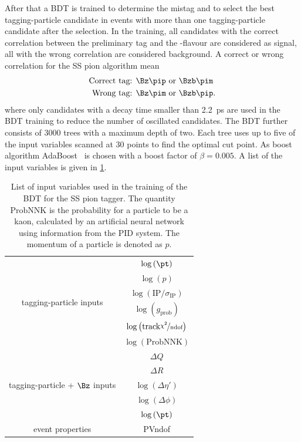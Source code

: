 After that a BDT is trained to determine the mistag and to select the best tagging-particle candidate in events with more than one tagging-particle candidate after the selection.
In the training, all candidates with the correct correlation between the preliminary tag and the \B-flavour are considered as signal, all with the wrong correlation are considered background.
A correct or wrong correlation for the SS pion algorithm mean
\begin{align*}
	\text{Correct tag: }& \Bz\pip \text{ or } \Bzb\pim\\
	\text{Wrong tag: }& \Bz\pim \text{ or } \Bzb\pip.
\end{align*}
where only \B candidates with a decay time smaller than \SI{2.2}{\pico\second} are used in the BDT training to reduce the number of oscillated \B candidates.
The BDT further consists of \num{3000} trees with a maximum depth of two.
Each tree uses up to five of the input variables scanned at 30 points to find the optimal cut point.
As boost algorithm AdaBoost~\cite{AdaBoost} is chosen with a boost factor of $\beta=0.005$.
A list of the input variables is given in \cref{tab:BDTInputSSPion}.
\begin{table}[tbp]
	\centering
	\caption{List of input variables used in the training of the BDT for the SS pion tagger.
	The quantity $\mathrm{ProbNNK}$ is the probability for a particle to be a kaon, calculated by an artificial neural network using information from the \lhcb PID system.
	The momentum of a particle is denoted as $p$.}
	\begin{tabular}{cc}
		\toprule
		\multirow{6}{*}{tagging-particle inputs} 	& $\log\left(\pt\right)$ \\
													& $\log\left(p\right)$ \\
													& $\log\left(\text{IP}/\sigma_\text{IP}\right)$\\
													& $\log\left(g_\text{prob}\right)$\\
													& $\log\left(\text{track} \nicefrac{\chi^2}{\text{ndof}}\right)$ \\
													& $\log\left(\text{ProbNNK}\right)$\\
		\midrule
		\multirow{5}{*}{tagging-particle + $\Bz$ inputs}	& $\Delta Q$\\
															& $\Delta R$\\
															& $\log\left(\Delta\eta'\right)$\\
															& $\log\left(\Delta\phi\right)$\\
															& $\log\left(\pt\right)$\\
		\midrule
		\multirow{1}{*}{event properties}	& PVndof\\
		\bottomrule
	\end{tabular}
	\label{tab:BDTInputSSPion}
\end{table}
